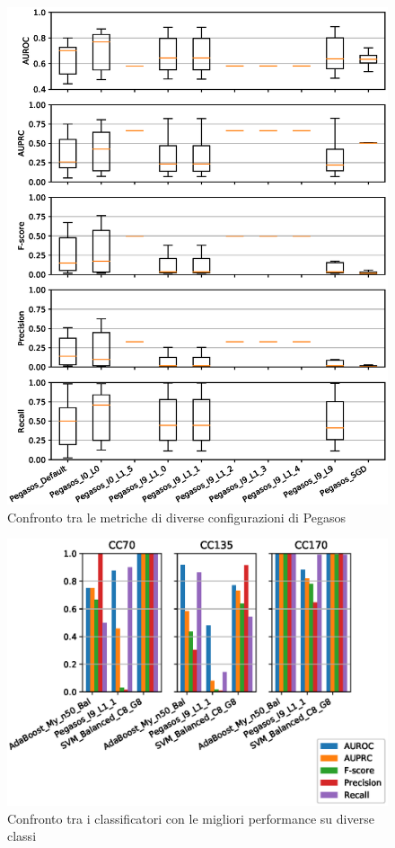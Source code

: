 \begin{figure}[hb]%
    \centering
    \includegraphics[scale = 0.80]{CC-Pegasos-level1}%
    \caption{Confronto tra le metriche di diverse configurazioni di Pegasos}%
    \label{figure:liv1.3}%
\end{figure}

\vspace*{\fill}



\vspace*{\fill}

\begin{figure}[ht]%
    \centering
    \includegraphics[scale = 0.80]{CC-level2}%
    \caption{Confronto tra i classificatori con le migliori performance su diverse classi}%
    \label{fig:liv2}%
\end{figure}

